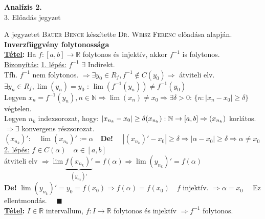 \documentclass[a4paper,11pt]{article}
\begin{document}
\def\defi{\normalsize \textbf{Definíció: }}
\def\Z{\mathbb{Z}}
\def\Q{\mathbb{Q}}
\def\R{\mathbb{R}}
\def\N{\mathbb{N}}
\def\bizva{\quad\blacksquare}
\def\biz{\normalsize{\underline{Bizonyítás:} }\hspace*{0.5cm}}
\def\tetel{\normalsize \textbf{\underline{Tétel}: }}
\def\limh{\displaystyle\lim_{h\to0}}
\begin{center}
	{\LARGE\textbf{Analízis 2.}}\\[0.2cm]
	
	{\Large 3. Előadás jegyzet}\\[0.5cm]	
\end{center}
{\small A jegyzetet \textsc{Bauer Bence} készítette \textsc{Dr. Weisz Ferenc} előadása alapján.}\\[0.2cm]
\textbf{{\Large Inverzfüggvény folytonossága}}\\[0.2cm]
\tetel Ha $f:[a,b]\to\R$ folytonos és injektív, akkor $f^{-1}$ is folytonos.\\[0.1cm]
\biz \underline{1. lépés:} $f^{-1}$  $\exists$ Indirekt.\\[0.1cm] Tfh. $f^{-1}$ nem
folytonos. $\Rightarrow\exists y_{0}\in R_f, f^{-1}\notin C(y_0)\Rightarrow$
átviteli elv.\\[0.1cm] $\exists y_n\in R_f,\lim(y_n)=y_0$ : $\lim(f^{-1}(y_n))\neq
f^{-1}(y_0)$\\[0.1cm] Legyen $x_n=f^{-1}(y_n),n\in\N\Rightarrow\lim(x_n)\neq
x_0\Rightarrow\exists\delta>0$: $\{n:|x_n-x_0|\geq\delta\}$ végtelen.\\[0.1cm]
Legyen $n_k$ indexsorozat, hogy: $|x_{n_k}-x_0|\geq\delta\\[0.1cm](x_{n_k}):
\N\to[a,b]\Rightarrow(x_{n_k})$ korlátos. $\Rightarrow\exists$ konvergens
részsorozat.\\[0.1cm] $(x_{n_k})':\quad\lim(x_{n_k})':=\alpha\quad$\textbf{De!}
$\quad|(x_{n_k})'-x_0|\geq\delta\Rightarrow|\alpha-x_0|\geq\delta\Rightarrow\alpha
\neq x_0$\\[0.1cm]\underline{2. lépés:} $f\in C(\alpha)\quad\alpha\in[a,b]$\\[0.1cm]
átviteli elv $\Rightarrow\lim\underbrace{f(x_{n_k})'}_{(y_{n_k})'}=
f(\alpha)\Rightarrow\lim(y_{n_k})'=f(\alpha)$\\[0.1cm]\textbf{De!}
$\lim(y_{n_k})'=y_0=f(x_0)\Rightarrow f(\alpha)=f(x_0)\quad f$ injektív.
$\Rightarrow\alpha=x_0\quad$ Ez ellentmondás. $\bizva$\\[0.3cm]
\tetel $I\in\R$ intervallum, $f:I\to\R$ folytonos és injektív $\Rightarrow f^{-1}$ folytonos.\\[0.1cm]
\end{document}
